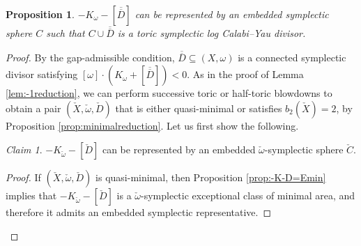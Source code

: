 \documentclass[11pt]{article}
\newtheorem{proposition}[theorem]{Proposition}
\theoremstyle{definition}
\theoremstyle{remark}
\newtheorem{claim}[theorem]{Claim}
\begin{document}
\begin{proposition}\label{prop:cycle}
  $-K_\omega-[\overline{\overline{D}}]$ can be represented by an embedded symplectic sphere $C$ such that $C\cup \overline{\overline{D}}$ is a toric symplectic log Calabi--Yau divisor.
\end{proposition}
\begin{proof}
  By the gap-admissible condition, $\overline{\overline{D}}\subseteq (X,\omega)$ is a connected symplectic divisor satisfying $[\omega]\cdot(K_\omega+[\overline{\overline{D}}])<0$. As in the proof of Lemma \ref{lem:-1reduction}, we can perform successive toric or half-toric blowdowns to obtain a pair $(\check{X},\check{\omega},\check{D})$ that is either quasi-minimal or satisfies $b_2(\check{X})=2$, by Proposition \ref{prop:minimalreduction}. Let us first show the following.
  \begin{claim}
   $-K_{\check{\omega}}-[\check{D}]$ can be represented by an embedded $\check{\omega}$-symplectic sphere $\check{C}$.
  \end{claim}
  \begin{proof}
     If $(\check{X},\check{\omega},\check{D})$ is quasi-minimal, then Proposition \ref{prop:-K-D=Emin} implies that $-K_{\check{\omega}}-[\check{D}]$ is a $\check{\omega}$-symplectic exceptional class of minimal area, and therefore it admits an embedded symplectic representative.


\end{proof}
\end{proof}
\end{document}
